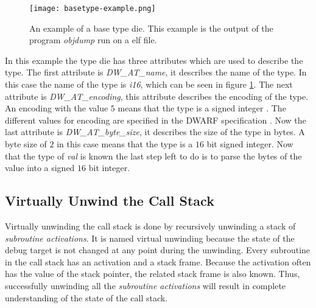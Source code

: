 \begin{figure}[h]
	\centering
	\texttt{[image: basetype-example.png]}
	\caption{An example of a base type \gls{die}. This example is the output of the program \emph{objdump} run on a \gls{elf} file.}
	\label{fig:basetypeexample}
\end{figure}


In this example the type \gls{die} has three attributes which are used to describe the type.
The first attribute is \emph{DW\_AT\_name}, it describes the name of the type.
In this case the name of the type is \emph{i16}, which can be seen in figure \ref{fig:basetypeexample}.
The next attribute is \emph{DW\_AT\_encoding}, this attribute describes the encoding of the type.
An encoding with the value $5$ means that the type is a signed integer \cite{dwarf}.
The different values for encoding are specified in the \gls{DWARF} specification \cite{dwarf}.
Now the last attribute is \emph{DW\_AT\_byte\_size}, it describes the size of the type in bytes.
A byte size of $2$ in this case means that the type is a $16$ bit signed integer.
Now that the type of \emph{val} is known the last step left to do is to parse the bytes of the value into a signed $16$ bit integer.



\subsection{Virtually Unwind the Call Stack}
\label{sec:stacktrace}
 


Virtually unwinding the call stack is done by recursively unwinding a stack of \emph{subroutine activations}.
It is named virtual unwinding because the state of the debug target is not changed at any point during the unwinding.
Every subroutine in the call stack has an activation and a stack frame.
Because the activation often has the value of the stack pointer, the related stack frame is also known.
Thus, successfully unwinding all the \emph{subroutine activations} will result in complete understanding of the state of the call stack.


